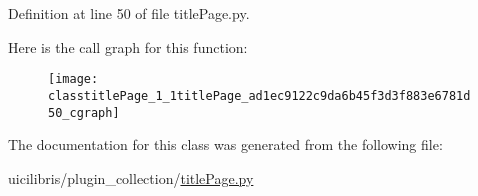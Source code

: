 \-Definition at line 50 of file title\-Page.\-py.



\-Here is the call graph for this function\-:
\nopagebreak
\begin{figure}[H]
\begin{center}
\leavevmode
\texttt{[image: classtitlePage\_1\_1titlePage\_ad1ec9122c9da6b45f3d3f883e6781d50\_cgraph]}
\end{center}
\end{figure}




\-The documentation for this class was generated from the following file\-:\begin{DoxyCompactItemize}
\item 
uicilibris/plugin\-\_\-collection/\hyperlink{titlePage_8py}{title\-Page.\-py}\end{DoxyCompactItemize}
